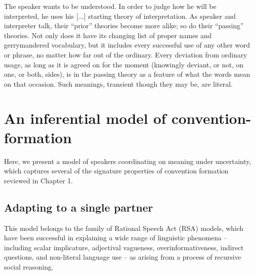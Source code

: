 \begin{savequote}[125mm]
    The speaker wants to be understood. %
    In order to judge how he will be interpreted, he uses his [...] starting theory of interpretation. %
As speaker and interpreter talk, their ``prior'' theories become more alike; so do their ``passing'' theories. %
Not only does it have its changing list of proper names and gerrymandered vocabulary, but it includes every successful use of any other word or phrase, no matter how far out of the ordinary. 
Every deviation from ordinary usage, as long as it is agreed on for the moment (knowingly deviant, or not, on one, or both, sides), is in the passing theory as a feature of what the words mean on that occasion. 
Such meanings, transient though they may be, are literal.
\end{savequote}

\chapter{An inferential model of convention-formation}
\graphicspath{{./figures/modeling/}}

Here, we present a model of speakers coordinating on meaning under uncertainty, which captures several of the signature properties of convention formation reviewed in Chapter 1. 

\section{Adapting to a single partner}
This model belongs to the family of Rational Speech Act (RSA) models, which have been successful in explaining a wide range of linguistic phenomena -- including scalar implicature, adjectival vagueness, overinformativeness, indirect questions, and non-literal language use -- as arising from a process of recursive social reasoning. 

